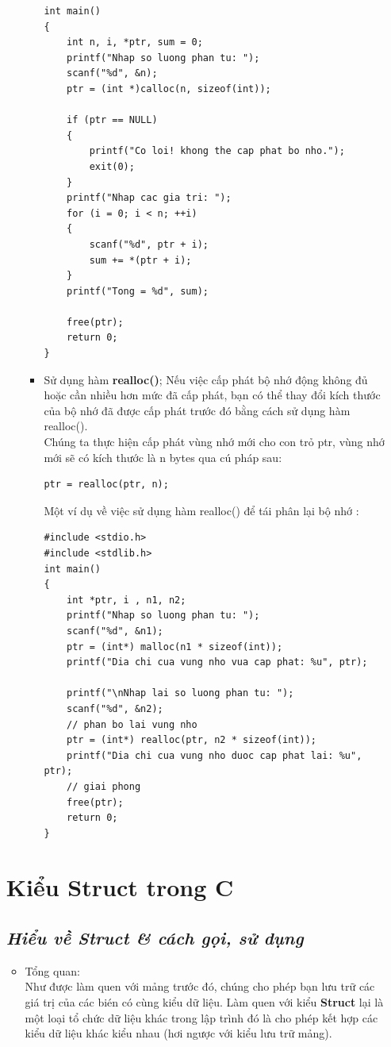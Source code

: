 \documentclass[12pt,a4paper]{article}
\begin{document}
\begin{itemize}
\begin{itemize}
\begin{itemize}
\begin{lstlisting}
int main()
{
    int n, i, *ptr, sum = 0;
    printf("Nhap so luong phan tu: ");
    scanf("%d", &n);
    ptr = (int *)calloc(n, sizeof(int));
 
    if (ptr == NULL)
    {
        printf("Co loi! khong the cap phat bo nho.");
        exit(0);
    }
    printf("Nhap cac gia tri: ");
    for (i = 0; i < n; ++i)
    {
        scanf("%d", ptr + i);
        sum += *(ptr + i);
    }
    printf("Tong = %d", sum);
 
    free(ptr);
    return 0;
}
\end{lstlisting}
\item Sử dụng hàm \textbf{realloc()};
Nếu việc cấp phát bộ nhớ động không đủ hoặc cần nhiều hơn mức đã cấp phát, bạn có thể thay đổi kích thước của bộ nhớ đã được cấp phát trước đó bằng cách sử dụng hàm realloc().\\
Chúng ta thực hiện cấp phát vùng nhớ mới cho con trỏ ptr, vùng nhớ mới sẽ có kích thước là n bytes qua cú pháp sau:
\begin{lstlisting}
ptr = realloc(ptr, n);
\end{lstlisting}
Một ví dụ về việc sử dụng hàm realloc() để tái phân lại bộ nhớ :
\begin{lstlisting}
#include <stdio.h>
#include <stdlib.h>
int main()
{
    int *ptr, i , n1, n2;
    printf("Nhap so luong phan tu: ");
    scanf("%d", &n1);
    ptr = (int*) malloc(n1 * sizeof(int));
    printf("Dia chi cua vung nho vua cap phat: %u", ptr);
    
    printf("\nNhap lai so luong phan tu: ");
    scanf("%d", &n2);
    // phan bo lai vung nho
    ptr = (int*) realloc(ptr, n2 * sizeof(int));
    printf("Dia chi cua vung nho duoc cap phat lai: %u", ptr);
    // giai phong 
    free(ptr);
    return 0;
}
\end{lstlisting}
\end{itemize}
\end{itemize}
\section{Kiểu Struct trong C}
\begin{center}
	\subsection*{\textbf{\textit{Hiểu về Struct \& cách gọi, sử dụng}}}
\end{center}
\begin{itemize}
\item {\large Tổng quan:}\\
Như được làm quen với mảng trước đó, chúng cho phép bạn lưu trữ các giá trị của các bién có cùng kiểu dữ liệu. Làm quen với kiểu \textbf{Struct} lại là một loại tổ chức dữ liệu khác trong lập trình đó là cho phép kết hợp các kiểu dữ liệu khác kiểu nhau (hơi ngược với kiểu lưu trữ mảng).\\


\end{itemize}
\end{itemize}
\end{document}
